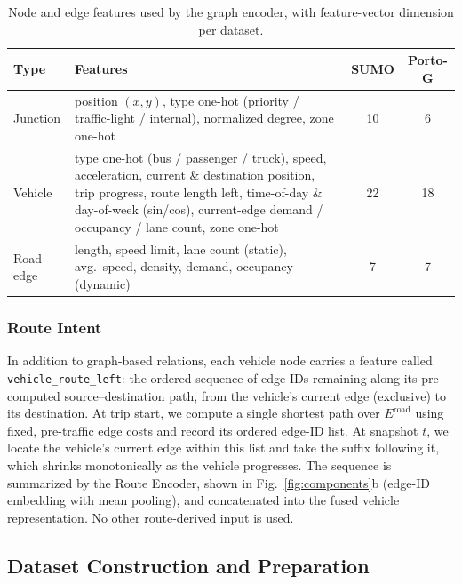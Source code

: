 \documentclass[pdflatex,sn-basic,Numbered]{sn-jnl}%
\begin{document}
\begin{table}[t]
    \centering
    \caption{Node and edge features used by the graph encoder, with feature-vector dimension per dataset.}\label{tab:node-edge-features}
    \begin{tabular}{@{}lp{6cm}cc@{}}
        \toprule
        \textbf{Type} & \textbf{Features} & \textbf{SUMO} & \textbf{Porto-G} \\
        \midrule
        Junction  & position $(x,y)$, type one-hot (priority / traffic-light / internal), normalized degree, zone one-hot & 10 & 6 \\
        Vehicle   & type one-hot (bus / passenger / truck), speed, acceleration, current \& destination position, trip progress, route length left, time-of-day \& day-of-week (sin/cos), current-edge demand / occupancy / lane count, zone one-hot & 22 & 18 \\
        Road edge & length, speed limit, lane count (static), avg.\ speed, density, demand, occupancy (dynamic) & 7 & 7 \\
        \bottomrule
    \end{tabular}
\end{table}

\subsubsection{Route Intent}
In addition to graph-based relations, each vehicle node carries a feature called \texttt{vehicle\_route\_left}: the ordered sequence of edge IDs remaining along its pre-computed source--destination path, from the vehicle's current edge (exclusive) to its destination. At trip start, we compute a single shortest path over $E^{\mathrm{road}}$ using fixed, pre-traffic edge costs and record its ordered edge-ID list. At snapshot $t$, we locate the vehicle's current edge within this list and take the suffix following it, which shrinks monotonically as the vehicle progresses. The sequence is summarized by the Route Encoder, shown in Fig.~\ref{fig:components}b (edge-ID embedding with mean pooling), and concatenated into the fused vehicle representation. No other route-derived input is used.

\subsection{Dataset Construction and Preparation}\label{sec:porto-conversion}
\end{document}
